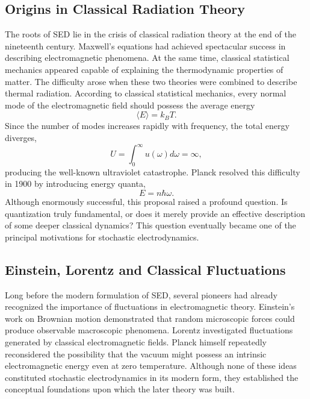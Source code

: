 \subsection{Origins in Classical Radiation Theory}
The roots of SED lie in the crisis of classical radiation theory at the
end of the nineteenth century.
Maxwell's equations had achieved spectacular success in describing
electromagnetic phenomena. At the same time, classical statistical
mechanics appeared capable of explaining the thermodynamic properties of
matter.
The difficulty arose when these two theories were combined to describe
thermal radiation.
According to classical statistical mechanics, every normal mode of the
electromagnetic field should possess the average energy
\[\langle E\rangle=k_BT.\]
Since the number of modes increases rapidly with frequency, the total
energy diverges,
\[U=\int_0^\infty u(\omega)d\omega=\infty,\]
producing the well-known ultraviolet catastrophe.
Planck resolved this difficulty in 1900 by introducing energy quanta,
\[E=n\hbar\omega.\]
Although enormously successful, this proposal raised a profound
question.
Is quantization truly fundamental, or does it merely provide an
effective description of some deeper classical dynamics?
This question eventually became one of the principal motivations for
stochastic electrodynamics.
\subsection{Einstein, Lorentz and Classical Fluctuations}
Long before the modern formulation of SED, several pioneers had already
recognized the importance of fluctuations in electromagnetic theory.
Einstein's work on Brownian motion demonstrated that random microscopic
forces could produce observable macroscopic phenomena.
Lorentz investigated fluctuations generated by classical
electromagnetic fields.
Planck himself repeatedly reconsidered the possibility that the vacuum
might possess an intrinsic electromagnetic energy even at zero
temperature.
Although none of these ideas constituted stochastic electrodynamics in
its modern form, they established the conceptual foundations upon which
the later theory was built.
